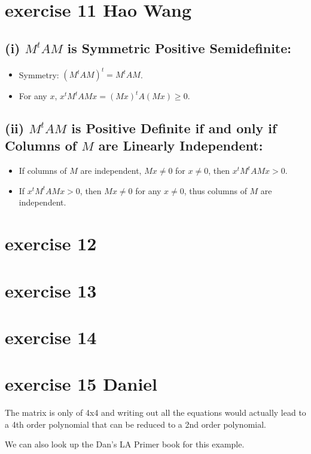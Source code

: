 \documentclass{article}
\begin{document}
\section{exercise 11 Hao Wang}

\subsection*{(i) \(M^t A M\) is Symmetric Positive Semidefinite:}

\begin{itemize}
    \item Symmetry: \((M^t A M)^t = M^t A M\).
    \item For any \(x\), \(x^t M^t A M x = (Mx)^t A (M x) \geq 0\).
\end{itemize}

\subsection*{(ii) \(M^t A M\) is Positive Definite if and only if Columns of \(M\) are Linearly Independent:}

\begin{itemize}
    \item If columns of \(M\) are independent, \(M x \neq 0\)  for \(x \neq 0\), then \(x^t M^t A M x > 0\).
    \item If \(x^t M^t A M x > 0\), then \(M x \neq 0\) for any \(x \neq 0\), thus columns of \(M\) are independent.
\end{itemize}

\section{exercise 12}
\section{exercise 13}
\section{exercise 14}
\section{exercise 15 Daniel}
The matrix is only of 4x4 and writing out all the equations would actually lead to a 4th order polynomial that can be reduced to a 2nd order polynomial.

We can also look up the Dan's LA Primer book for this example.
\end{document}
